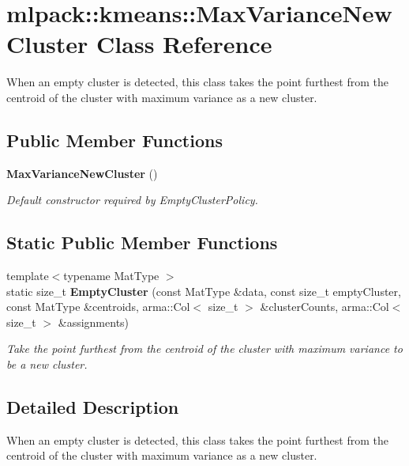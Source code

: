 \section{mlpack\-:\-:kmeans\-:\-:Max\-Variance\-New\-Cluster Class Reference}
\label{classmlpack_1_1kmeans_1_1MaxVarianceNewCluster}


When an empty cluster is detected, this class takes the point furthest from the centroid of the cluster with maximum variance as a new cluster.  


\subsection*{Public Member Functions}
\begin{DoxyCompactItemize}
\item 
{\bf Max\-Variance\-New\-Cluster} ()
\begin{DoxyCompactList}\small\item\em Default constructor required by Empty\-Cluster\-Policy. \end{DoxyCompactList}\end{DoxyCompactItemize}
\subsection*{Static Public Member Functions}
\begin{DoxyCompactItemize}
\item 
{\footnotesize template$<$typename Mat\-Type $>$ }\\static size\-\_\-t {\bf Empty\-Cluster} (const Mat\-Type \&data, const size\-\_\-t empty\-Cluster, const Mat\-Type \&centroids, arma\-::\-Col$<$ size\-\_\-t $>$ \&cluster\-Counts, arma\-::\-Col$<$ size\-\_\-t $>$ \&assignments)
\begin{DoxyCompactList}\small\item\em Take the point furthest from the centroid of the cluster with maximum variance to be a new cluster. \end{DoxyCompactList}\end{DoxyCompactItemize}


\subsection{Detailed Description}
When an empty cluster is detected, this class takes the point furthest from the centroid of the cluster with maximum variance as a new cluster. 

